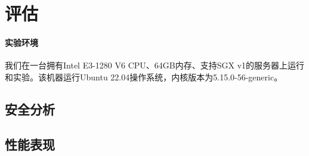 \section{评估}\label{sec:evaluation}

\paragraph{实验环境}

我们在一台拥有Intel E3-1280 V6 CPU、64GB内存、支持SGX v1的服务器上运行和实验。该机器运行Ubuntu 22.04操作系统，内核版本为5.15.0-56-generic。

\subsection{安全分析}

\subsection{性能表现}

